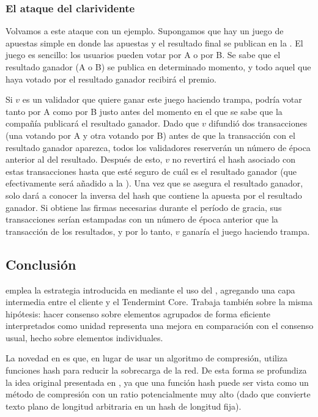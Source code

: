 \subsubsection{El ataque del clarividente}

Volvamos a este ataque con un ejemplo. Supongamos que hay un juego de apuestas simple en donde
las apuestas y el resultado final se publican en la \hashchain. El juego es sencillo: los usuarios
pueden votar por A o por B. Se sabe que el resultado ganador (A o B) se publica en determinado momento,
y todo aquel que haya votado por el resultado ganador recibirá el premio.
%

Si $v$ es un validador que quiere ganar este juego haciendo trampa, podría votar tanto por A
como por B justo antes del momento en el que se sabe que la compañía publicará el resultado ganador.
%
Dado que $v$ difundió dos transacciones (una votando por A y otra votando por B) antes de que la
transacción con el resultado ganador aparezca, todos los validadores reserverán un número de época
anterior al del resultado. Después de esto, $v$ no revertirá el hash asociado con estas transacciones
hasta que esté seguro de cuál es el resultado ganador (que efectivamente será añadido a la \hashchain).
%
Una vez que se asegura el resultado ganador, solo dará a conocer la inversa del hash que contiene la apuesta
por el resultado ganador. Si obtiene las firmas necesarias durante el período de gracia,
sus transacciones serían estampadas con un número de época anterior que la transacción de los resultados,
y por lo tanto, $v$ ganaría el juego haciendo trampa.

\subsection{Conclusión}

\hashchain emplea la estrategia introducida en \compresschain mediante el uso del \collector,
agregando una capa
intermedia entre el cliente y el Tendermint Core.
Trabaja también sobre la misma hipótesis: hacer consenso sobre elementos agrupados de forma eficiente
interpretados como unidad representa una mejora en comparación con el consenso usual, hecho sobre elementos
individuales.

La novedad en \hashchain es que, en lugar de usar un algoritmo de compresión, utiliza funciones hash
para reducir la sobrecarga de la red.
De esta forma se profundiza la idea original presentada en \compresschain, ya que una función hash
puede ser vista como un método de compresión con un ratio potencialmente muy alto (dado que convierte
texto plano de longitud arbitraria en un hash de longitud fija).

